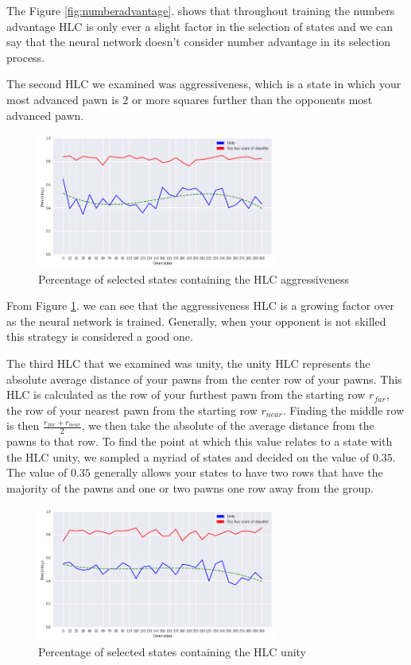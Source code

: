 The Figure \ref{fig:numberadvantage}. shows that throughout training the numbers advantage HLC is only ever a slight factor in the selection of states and we can say that the neural network doesn't consider number advantage in its selection process.

The second HLC we examined was aggressiveness, which is a state in which your most advanced pawn is $2$ or more squares further than the opponents most advanced pawn.

\begin{figure}[]
    \centering
    \includegraphics[width=0.7\textwidth]{graphics/most_advanced_trend.png}
    \caption{Percentage of selected states containing the HLC aggressiveness}
    \label{fig:aggressiveness}
\end{figure}

From Figure \ref{fig:aggressiveness}. we can see that the aggressiveness HLC is a growing factor over as the neural network is trained. Generally, when your opponent is not skilled this strategy is considered a good one.

The third HLC that we examined was unity, the unity HLC represents the absolute average distance of your pawns from the center row of your pawns. This HLC is calculated as the row of your furthest pawn from the starting row $r_{far}$, the row of your nearest pawn from the starting row $r_{near}$. Finding the middle row is then $\frac{r_{far} + r_{near}}{2}$, we then take the absolute of the average distance from the pawns to that row. To find the point at which this value relates to a state with the HLC unity, we sampled a myriad of states and decided on the value of $0.35$. The value of $0.35$ generally allows your states to have two rows that have the majority of the pawns and one or two pawns one row away from the group.

\begin{figure}[]
    \centering
    \includegraphics[width=0.7\textwidth]{graphics/unity_trend.png}
    \caption{Percentage of selected states containing the HLC unity}
    \label{fig:unity}
\end{figure}

